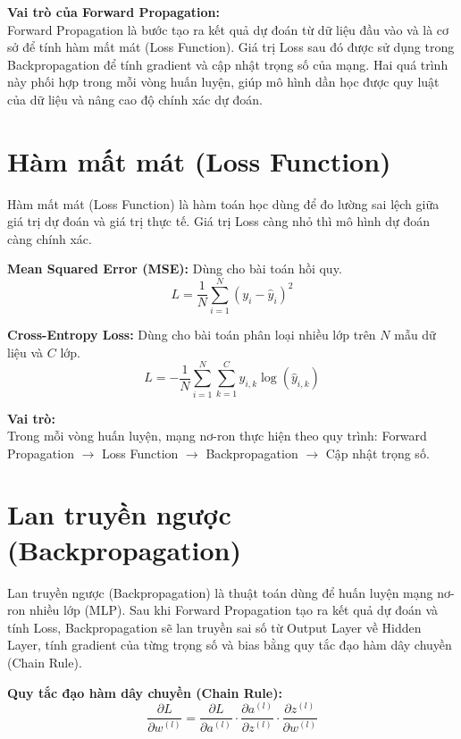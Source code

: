 \documentclass[12pt,a4paper]{report}
\begin{document}
\textbf{Vai trò của Forward Propagation:} \\
Forward Propagation là bước tạo ra kết quả dự đoán từ dữ liệu đầu vào và là cơ sở để tính hàm mất mát (Loss Function). Giá trị Loss sau đó được sử dụng trong Backpropagation để tính gradient và cập nhật trọng số của mạng. Hai quá trình này phối hợp trong mỗi vòng huấn luyện, giúp mô hình dần học được quy luật của dữ liệu và nâng cao độ chính xác dự đoán.

\section{Hàm mất mát (Loss Function)}
Hàm mất mát (Loss Function) là hàm toán học dùng để đo lường sai lệch giữa giá trị dự đoán và giá trị thực tế. Giá trị Loss càng nhỏ thì mô hình dự đoán càng chính xác. 

\textbf{Mean Squared Error (MSE):} Dùng cho bài toán hồi quy.
\begin{equation}
    L = \frac{1}{N} \sum_{i=1}^N (y_i - \hat{y}_i)^2
\end{equation}

\textbf{Cross-Entropy Loss:} Dùng cho bài toán phân loại nhiều lớp trên $N$ mẫu dữ liệu và $C$ lớp.
\begin{equation}
    L = - \frac{1}{N} \sum_{i=1}^N \sum_{k=1}^C y_{i,k} \log(\hat{y}_{i,k})
\end{equation}

\textbf{Vai trò:} \\
Trong mỗi vòng huấn luyện, mạng nơ-ron thực hiện theo quy trình: Forward Propagation $\rightarrow$ Loss Function $\rightarrow$ Backpropagation $\rightarrow$ Cập nhật trọng số.

\section{Lan truyền ngược (Backpropagation)}
Lan truyền ngược (Backpropagation) là thuật toán dùng để huấn luyện mạng nơ-ron nhiều lớp (MLP). Sau khi Forward Propagation tạo ra kết quả dự đoán và tính Loss, Backpropagation sẽ lan truyền sai số từ Output Layer về Hidden Layer, tính gradient của từng trọng số và bias bằng quy tắc đạo hàm dây chuyền (Chain Rule).

\textbf{Quy tắc đạo hàm dây chuyền (Chain Rule):}
\begin{equation}
    \frac{\partial L}{\partial w^{(l)}} = \frac{\partial L}{\partial a^{(l)}} \cdot \frac{\partial a^{(l)}}{\partial z^{(l)}} \cdot \frac{\partial z^{(l)}}{\partial w^{(l)}}
\end{equation}
\end{document}
